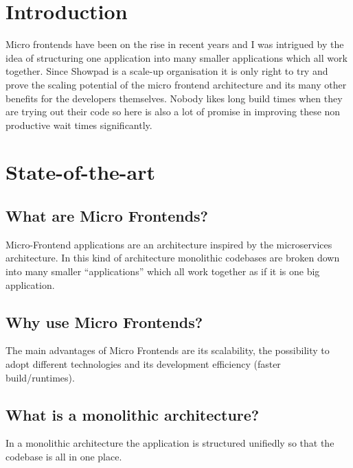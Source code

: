 
\section{Introduction} %
\label{sec:introductie}

Micro frontends have been on the rise in recent years and I was intrigued by the idea of structuring one application into many smaller applications which all work together. Since Showpad is a scale-up organisation it is only right to try and prove the scaling potential of the micro frontend architecture and its many other benefits for the developers themselves. Nobody likes long build times when they are trying out their code so here is also a lot of promise in improving these non productive wait times significantly.


\section{State-of-the-art}
\label{sec:state-of-the-art}

\subsection{What are Micro Frontends?}
Micro-Frontend applications are an architecture inspired by the microservices architecture.
In this kind of architecture monolithic codebases are broken down into many smaller “applications” which all work together as if it is one big application. 

\subsection{Why use Micro Frontends?}
The main advantages of Micro Frontends are its scalability, the possibility to adopt different technologies and its development efficiency (faster build/runtimes).

\subsection{What is a monolithic architecture?}
In a monolithic architecture the application is structured unifiedly so that the codebase is all in one place.

